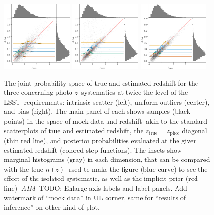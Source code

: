 \documentclass[iop]{emulateapj}
\newcommand{\todo}[3]{{\color{#2}\emph{#1}: #3}}
\newcommand{\aim}[1]{\todo{AIM}{red}{#1}}
\newcommand{\project}[1]{\textsc{#1}}
\newcommand{\lsst}{\project{LSST}}
\newcommand{\pz}{photo-$z$}
\newcommand{\nz}{$n(z)$}
\begin{document}
\begin{figure}
	\begin{center}
		\includegraphics[width=0.32\textwidth]{figures/chippr/thesis_hivarsig-mega_scatter.png}
		\includegraphics[width=0.32\textwidth]{figures/chippr/single_uout-mega_scatter.png}
		\includegraphics[width=0.32\textwidth]{figures/chippr/thesis_neghivarbias-mega_scatter.png}
		\caption{The joint probability space of true and estimated redshift for the three concerning \pz\ systematics at twice the level of the \lsst\ requirements: intrinsic scatter (left), uniform outliers (center), and bias (right).
			The main panel of each shows samples (black points) in the space of mock data and redshift, akin to the standard scatterplots of true and estimated redshift, the $z_{\mathrm{true}} = z_{\mathrm{phot}}$ diagonal (thin red line), and posterior probabilities evaluated at the given estimated redshift (colored step functions).
			The insets show marginal histograms (gray) in each dimension, that can be compared with the true \nz\ used to make the figure (blue curve) to see the effect of the isolated systematic, as well as the implicit prior (red line).
			\aim{TODO: Enlarge axis labels and label panels.
			Add watermark of ``mock data'' in UL corner, same for ``results of inference'' on other kind of plot.}
		}
		\label{fig:mega_scatter}
	\end{center}
\end{figure}
\end{document}
